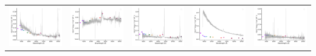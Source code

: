 \begin{center}
\begin{longtable}{l l l l l }
    \includegraphics[width=0.19\linewidth, clip]{Figs/Figs-sdss/spec-0983-52443-0348-STRIPE82-0104-019279.pdf} & \includegraphics[width=0.19\linewidth, clip]{Figs/Figs-sdss/spec-0983-52443-0459-STRIPE82-0106-052252.pdf} & \includegraphics[width=0.19\linewidth, clip]{Figs/Figs-sdss/spec-0984-52442-0311-STRIPE82-0105-069446.pdf} & \includegraphics[width=0.19\linewidth, clip]{Figs/Figs-sdss/spec-0984-52442-0533-STRIPE82-0108-039253.pdf} & \includegraphics[width=0.19\linewidth, clip]{Figs/Figs-sdss/spec-0990-52465-0605-STRIPE82-0124-071122.pdf} \\

\end{longtable}
\end{center}
